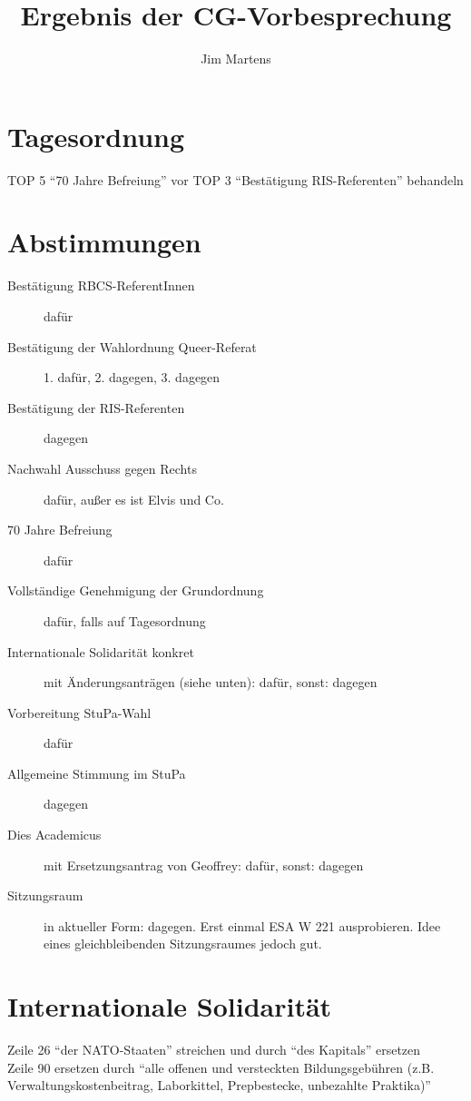 \documentclass[10pt,a4paper,oneside,ngerman,numbers=noenddot]{scrartcl}
\begin{document}
\author{Jim Martens}
\title{Ergebnis der CG-Vorbesprechung}
\maketitle

\section{Tagesordnung}

TOP 5 ``70 Jahre Befreiung'' vor TOP 3 ``Bestätigung RIS-Referenten'' behandeln

\section{Abstimmungen}

\begin{description}
	\item[Bestätigung RBCS-ReferentInnen] dafür
	\item[Bestätigung der Wahlordnung Queer-Referat] 1. dafür, 2. dagegen, 3. dagegen
	\item[Bestätigung der RIS-Referenten] dagegen
	\item[Nachwahl Ausschuss gegen Rechts] dafür, außer es ist Elvis und Co.
	\item[70 Jahre Befreiung] dafür
	\item[Vollständige Genehmigung der Grundordnung] dafür, falls auf Tagesordnung
	\item[Internationale Solidarität konkret] mit Änderungsanträgen (siehe unten): dafür, sonst: dagegen
	\item[Vorbereitung StuPa-Wahl] dafür
	\item[Allgemeine Stimmung im StuPa] dagegen
	\item[Dies Academicus] mit Ersetzungsantrag von Geoffrey: dafür, sonst: dagegen
	\item[Sitzungsraum] in aktueller Form: dagegen. Erst einmal ESA W 221 ausprobieren. Idee eines gleichbleibenden Sitzungsraumes jedoch gut.
\end{description}

\section{Internationale Solidarität}

Zeile 26 "`der NATO-Staaten"' streichen und durch "`des Kapitals"' ersetzen\\
Zeile 90 ersetzen durch "`alle offenen und versteckten Bildungsgebühren (z.B. Verwaltungskostenbeitrag, Laborkittel, Prepbestecke, unbezahlte Praktika)"'
\end{document}
